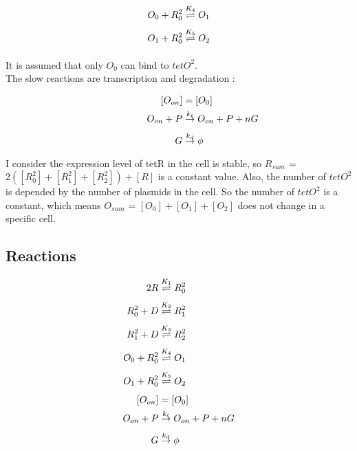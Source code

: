 \begin{equation} 
\begin{aligned} 
\centering
O_0 + R^2_0  &\underset{}{\overset{K_4}{\rightleftharpoons}} O_1 \\ 
O_1 + R^2_0  &\underset{}{\overset{K_5}{\rightleftharpoons}} O_2 \\  
\end{aligned} 
\end{equation}

It is assumed that only $O_0$ can bind to $tetO^{2}$. \\
The slow reactions are transcription and degradation :

\begin{equation} 
\centering
\begin{aligned} 
\qquad \qquad \quad[O_{on}]    &= [O_0] \\
\qquad \qquad \quad O_{on} + P &\underset{}{\overset{k_t}{\rightarrow}} 
O_{on} + P + nG \\ 
\qquad \qquad \quad G          &\underset{}{\overset{k_d}{\rightarrow}} 
\phi \\  
\end{aligned} 
\end{equation}
I consider the expression level of tetR in the cell is stable, so 
$R_{sum}$ = $2([R_0^2]+[R_1^2]+[R_2^2])+[R]$ is a constant value. Also, the number of $tetO^{2}$ is depended by the number of plasmids in the cell. So the number of $tetO^{2}$ is a constant, which means $O_{sum}$ = $[O_0]+[O_1]+[O_2]$ does not change in a specific cell.

\subsection{Reactions}

\begin{equation*} 
\begin{aligned} 
\centering
2R           &\underset{}{\overset{K_1}{\rightleftharpoons}} R^2_0 \\ 
R^2_0 + D    &\underset{}{\overset{K_2}{\rightleftharpoons}} R^2_1 \\ 
R^2_1 + D    &\underset{}{\overset{K_3}{\rightleftharpoons}} R^2_2 \\  
O_0 + R^2_0  &\underset{}{\overset{K_4}{\rightleftharpoons}} O_1 \\ 
O_1 + R^2_0  &\underset{}{\overset{K_5}{\rightleftharpoons}} O_2 \\ 
[O_{on}]     &= [O_0] \\
O_{on} + P   &\underset{}{\overset{k_t}{\rightarrow}} O_{on} + P + nG \\ 
G            &\underset{}{\overset{k_d}{\rightarrow}} \phi \\  
\end{aligned} 
\end{equation*}


